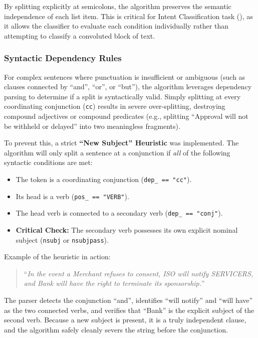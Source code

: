 \documentclass[twoside,final]{hcmut-report}
\newcommand{\result}[1]{\fcolorbox{red}{white}{#1}}
\begin{document}
By splitting explicitly at semicolons, the algorithm preserves the semantic independence of each list item. This is critical for Intent Classification task (\result{Section~\ref{task_2.3}}), as it allows the classifier to evaluate each condition individually rather than attempting to classify a convoluted block of text.

\subsubsection*{Syntactic Dependency Rules}
For complex sentences where punctuation is insufficient or ambiguous (such as clauses connected by ``and'', ``or'', or ``but''), the algorithm leverages dependency parsing to determine if a split is syntactically valid. Simply splitting at every coordinating conjunction (\verb|cc|) results in severe over-splitting, destroying compound adjectives or compound predicates (e.g., splitting ``Approval will not be withheld or delayed'' into two meaningless fragments).

\medskip

To prevent this, a strict \textbf{``New Subject'' Heuristic} was implemented. The algorithm will only split a sentence at a conjunction if \emph{all} of the following syntactic conditions are met:

\begin{itemize}[topsep=0pt, parsep=0pt, itemsep=0pt]
  \item The token is a coordinating conjunction (\verb|dep_ == "cc"|).
  \item Its head is a verb (\verb|pos_ == "VERB"|).
  \item The head verb is connected to a secondary verb (\verb|dep_ == "conj"|).
  \item \textbf{Critical Check:} The secondary verb possesses its own explicit nominal subject (\verb|nsubj| or \verb|nsubjpass|).
\end{itemize}

Example of the heuristic in action:

\begin{quote}
  ``\textit{In the event a Merchant refuses to consent, ISO will notify SERVICERS, and Bank will have the right to terminate its sponsorship.}''
\end{quote}

The parser detects the conjunction ``and'', identifies ``will notify'' and ``will have'' as the two connected verbs, and verifies that ``Bank'' is the explicit subject of the second verb. Because a new subject is present, it is a truly independent clause, and the algorithm safely cleanly severs the string before the conjunction.
\end{document}
